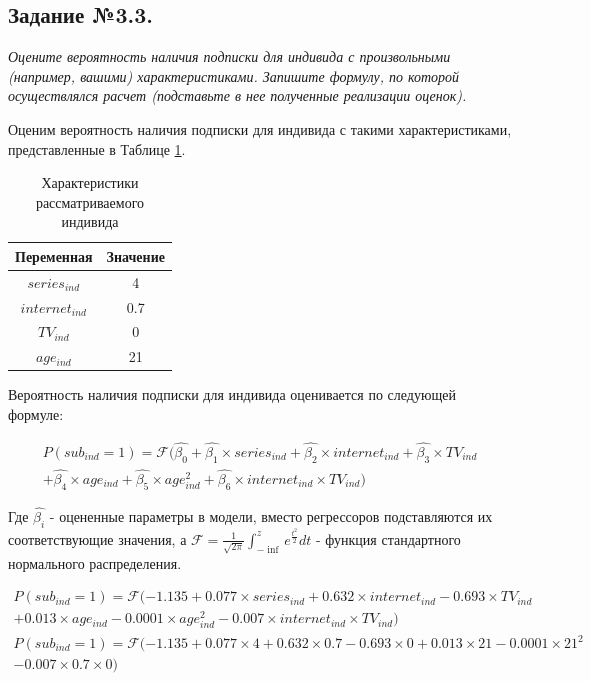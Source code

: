 \documentclass[a4paper,12pt]{article}
\begin{document}
	\subsection{Задание №3.3.}
	\textit{
	Оцените вероятность наличия подписки для индивида с произвольными (например, вашими) характеристиками. Запишите формулу, по которой осуществлялся расчет (подставьте в нее полученные реализации оценок). }
	
	\vspace{1cm}
	
	Оценим вероятность наличия подписки для индивида с такими характеристиками, представленные в Таблице \ref{individ1}.
	
	\begin{table}[!h]
		\caption{Характеристики рассматриваемого индивида}
		\label{individ1}
		\centering
		\small
		\begin{tabular}{|c|c|}
			\hline
			Переменная &  Значение  \\ 
			\hline
			$series_{ind} $ &4 \\ 
			\hline
			$internet_{ind} $ &0.7 \\ 		
			\hline
			$TV_{ind} $ &0 \\ 	
			\hline
			$age_{ind} $ &21 \\ 
			\hline
		\end{tabular}
	\end{table}

	\vspace{1.5cm}

	Вероятность наличия подписки для индивида оценивается по следующей формуле:
	
	\begin{align*}
		P(sub_{ind}=1)= \mathcal{F} (\hat{\beta_0} + \hat{\beta_1} \times series_{ind}+ \hat{\beta_2} \times internet _{ind} +\hat{\beta_3}  \times TV_{ind} \\+ \hat{\beta_4} \times age_{ind} + \hat{\beta_5}\times age_{ind}^2 +\hat{\beta_6} \times internet_{ind} \times TV_{ind}) 
	\end{align*}

	Где $\hat{\beta_i}$ - оцененные параметры в модели, вместо регрессоров подставляются их соответствующие значения, а $\mathcal{F} = \frac{1}{\sqrt{2\pi}}\int_{-\inf}^z e^{\frac{t^2}{2}}dt$ - функция стандартного нормального распределения. 
	
	\begin{align*}
		P(sub_{ind}=1)= \mathcal{F} (-1.135+0.077\times series_{ind}+ 0.632 \times internet _{ind} -0.693 \times TV_{ind} \\+ 0.013\times age_{ind} - 0.0001\times age_{ind}^2-0.007  \times internet_{ind} \times TV_{ind}) \\
		P(sub_{ind}=1)= \mathcal{F} (-1.135+0.077\times 4 + 0.632 \times 0.7 -0.693 \times 0 + 0.013\times 21- 0.0001\times 21^2\\-0.007  \times 0.7 \times 0)
	\end{align*}
	
\end{document}
